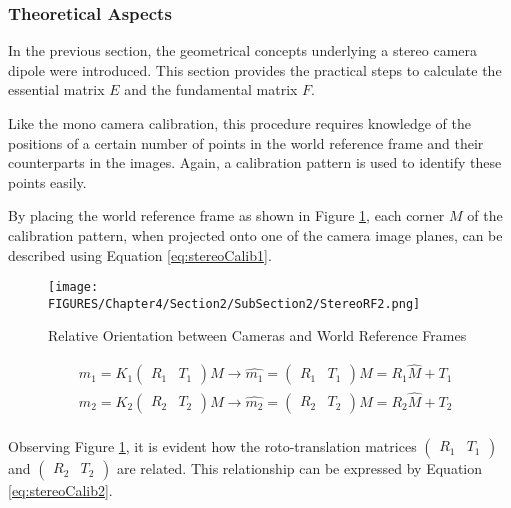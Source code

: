 \subsubsection{Theoretical Aspects}

In the previous section, the geometrical concepts underlying a stereo camera dipole were introduced. This section provides the practical steps to calculate the essential matrix $E$ and the fundamental matrix $F$.

Like the mono camera calibration, this procedure requires knowledge of the positions of a certain number of points in the world reference frame and their counterparts in the images. 
Again, a calibration pattern is used to identify these points easily.

By placing the world reference frame as shown in Figure \ref{fig:StereoRF2}, each corner $M$ of the calibration pattern, when projected onto one of the camera image planes, can be described using Equation \ref{eq:stereoCalib1}.

\begin{figure}[!h]
  \centering
  \texttt{[image: FIGURES/Chapter4/Section2/SubSection2/StereoRF2.png]}
  \caption{Relative Orientation between Cameras and World Reference Frames} 
  \label{fig:StereoRF2}  
\end{figure}

\begin{equation}
  \label{eq:stereoCalib1}
  \begin{aligned}
  & m_1 = K_1 \begin{pmatrix} R_1 & T_1 \end{pmatrix} M
  \longrightarrow \hat{m_1} = \begin{pmatrix} R_1 & T_1 \end{pmatrix} M 
  = R_1 \hat{M} + T_1 \\ 
  & m_2 = K_2 \begin{pmatrix} R_2 & T_2 \end{pmatrix} M 
  \longrightarrow \hat{m_2} = \begin{pmatrix} R_2 & T_2 \end{pmatrix} M 
  = R_2 \hat{M} + T_2\\
  \end{aligned}
\end{equation}

Observing Figure \ref{fig:StereoRF2}, it is evident how the roto-translation matrices $\begin{pmatrix} R_1 & T_1 \end{pmatrix}$ and $\begin{pmatrix} R_2 & T_2 \end{pmatrix}$ are related. This relationship can be expressed by Equation \ref{eq:stereoCalib2}.

